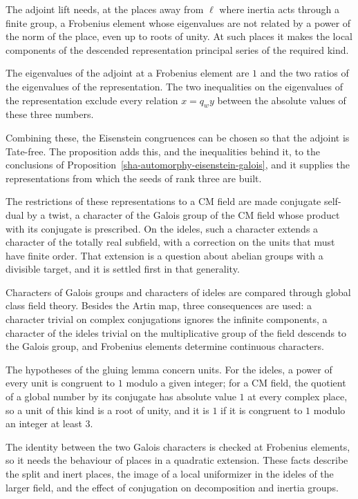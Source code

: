 The adjoint lift needs, at the places away from $\ell$ where inertia acts through a finite group, a Frobenius element whose eigenvalues are not related by a power of the norm of the place, even up to roots of unity. At such places it makes the local components of the descended representation principal series of the required kind.

The eigenvalues of the adjoint at a Frobenius element are $1$ and the two ratios of the eigenvalues of the representation. The two inequalities on the eigenvalues of the representation exclude every relation $x=q_wy$ between the absolute values of these three numbers.

Combining these, the Eisenstein congruences can be chosen so that the adjoint is Tate-free. The proposition adds this, and the inequalities behind it, to the conclusions of Proposition~\ref{sha-automorphy-eisenstein-galois}, and it supplies the representations from which the seeds of rank three are built.

The restrictions of these representations to a CM field are made conjugate self-dual by a twist, a character of the Galois group of the CM field whose product with its conjugate is prescribed. On the ideles, such a character extends a character of the totally real subfield, with a correction on the units that must have finite order. That extension is a question about abelian groups with a divisible target, and it is settled first in that generality.

Characters of Galois groups and characters of ideles are compared through global class field theory. Besides the Artin map, three consequences are used: a character trivial on complex conjugations ignores the infinite components, a character of the ideles trivial on the multiplicative group of the field descends to the Galois group, and Frobenius elements determine continuous characters.

The hypotheses of the gluing lemma concern units. For the ideles, a power of every unit is congruent to $1$ modulo a given integer; for a CM field, the quotient of a global number by its conjugate has absolute value $1$ at every complex place, so a unit of this kind is a root of unity, and it is $1$ if it is congruent to $1$ modulo an integer at least $3$.

The identity between the two Galois characters is checked at Frobenius elements, so it needs the behaviour of places in a quadratic extension. These facts describe the split and inert places, the image of a local uniformizer in the ideles of the larger field, and the effect of conjugation on decomposition and inertia groups.

